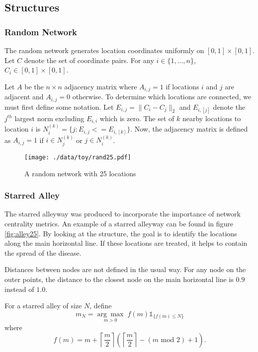 \documentclass[11pt]{article}
\begin{document}
\subsection{Structures}
\label{sec-1-3}

\subsubsection{Random Network}
\label{sec-1-3-1}

The random network generates location coordinates uniformly on $[0,1]
\times [0,1]$.  Let $C$ denote the set of coordinate pairs.  For any
$i \in \lbrace 1,...,n \rbrace$, $C_{i} \in [0,1] \times [0,1]$.

Let $A$ be the $n \times n$ adjacency matrix where $A_{i,j} = 1$ if
locations $i$ and $j$ are adjacent and $A_{i,j} = 0$ otherwise.  To
determine which locations are connected, we must first define some
notation.  Let $E_{i,j} = \|C_{i} - C_{j}\|_2$ and $E_{i,[j]}$ denote
the $j^{th}$ largest norm excluding $E_{i,i}$ which is zero.  The set
of $k$ nearby locations to location $i$ is $N^{(k)}_i = \lbrace j :
E_{i,j} <= E_{i,[k]} \rbrace$.  Now, the adjacency matrix is defined
as $A_{i,j} = 1$ if $i \in N_{j}^{(k)}$ or $j \in N_{i}^{(k)}$.


\begin{figure}[htb]
\centering
\texttt{[image: ./data/toy/rand25.pdf]}
\caption{\label{fig:rand25}A random network with 25 locations}
\end{figure}



\subsubsection{Starred Alley}
\label{sec-1-3-2}

The starred alleyway was produced to incorporate the importance of
network centrality metrics.  An example of a starred alleyway can be
found in figure \ref{fig:alley25}.  By looking at the structure, the goal is
to identify the locations along the main horizontal line.  If these
locations are treated, it helps to contain the spread of the disease.

Distances between nodes are not defined in the usual way.  For any
node on the outer points, the distance to the closest node on the main
horizontal line is $0.9$ instead of $1.0$.

For a starred alley of size $N$, define
\begin{equation*}
  m_N = \underset{m > 0}{\arg\max} \; f(m) \mathds{1}_{\lbrace f(m) \le N
    \rbrace }
\end{equation*}
where
\begin{equation*}
  f(m) = m + \left\lceil \frac{m}{2}
  \right\rceil 
  \left(\left\lceil \frac{m}{2} \right\rceil
    - (m \text{ mod } 2) + 1 \right).
\end{equation*}
\end{document}
